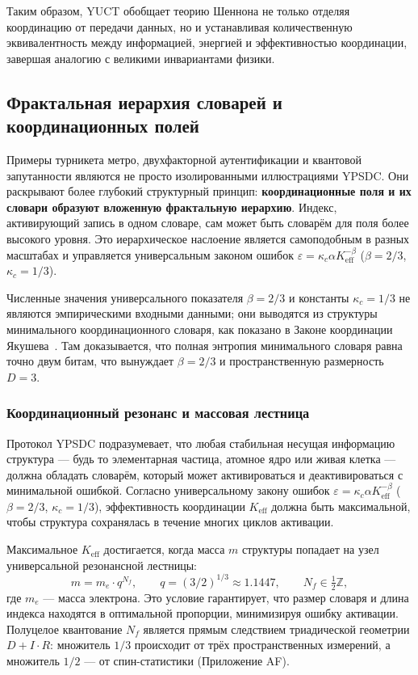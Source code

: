 \documentclass[12pt,a4paper]{article}
\theoremstyle{remark}
\begin{document}
	Таким образом, YUCT обобщает теорию Шеннона не только отделяя координацию от передачи данных, но и устанавливая количественную эквивалентность между информацией, энергией и эффективностью координации, завершая аналогию с великими инвариантами физики.
	
	\subsection{Фрактальная иерархия словарей и координационных полей}
	\label{subsec:fractal-hierarchy}
	
	Примеры турникета метро, двухфакторной аутентификации и квантовой запутанности являются не просто изолированными иллюстрациями YPSDC. Они раскрывают более глубокий структурный принцип: \textbf{координационные поля и их словари образуют вложенную фрактальную иерархию}. Индекс, активирующий запись в одном словаре, сам может быть словарём для поля более высокого уровня. Это иерархическое наслоение является самоподобным в разных масштабах и управляется универсальным законом ошибок $\varepsilon = \kappa_c \alpha K_{\mathrm{eff}}^{-\beta}$ ($\beta=2/3$, $\kappa_c=1/3$).
	
	Численные значения универсального показателя \(\beta = 2/3\) и константы \(\kappa_c = 1/3\) не являются эмпирическими входными данными; они выводятся из структуры минимального координационного словаря, как показано в Законе координации Якушева~\cite{YakushevLaw2026}. Там доказывается, что полная энтропия минимального словаря равна точно двум битам, что вынуждает \(\beta = 2/3\) и пространственную размерность \(D = 3\).
	
	\subsubsection{Координационный резонанс и массовая лестница}
	
	Протокол YPSDC подразумевает, что любая стабильная несущая информацию структура — будь то элементарная частица, атомное ядро или живая клетка — должна обладать словарём, который может активироваться и деактивироваться с минимальной ошибкой. Согласно универсальному закону ошибок \(\varepsilon = \kappa_c\alpha K_{\mathrm{eff}}^{-\beta}\) (\(\beta = 2/3\), \(\kappa_c = 1/3\)), эффективность координации \(K_{\mathrm{eff}}\) должна быть максимальной, чтобы структура сохранялась в течение многих циклов активации.
	
	Максимальное \(K_{\mathrm{eff}}\) достигается, когда масса \(m\) структуры попадает на узел универсальной резонансной лестницы:
	\[
	m = m_e \cdot q^{N_f}, \qquad
	q = (3/2)^{1/3} \approx 1.1447, \qquad N_f \in \tfrac{1}{2}\mathbb{Z},
	\]
	где \(m_e\) — масса электрона. Это условие гарантирует, что размер словаря и длина индекса находятся в оптимальной пропорции, минимизируя ошибку активации. Полуцелое квантование \(N_f\) является прямым следствием триадической геометрии \(D+I\!\cdot\!R\): множитель \(1/3\) происходит от трёх пространственных измерений, а множитель \(1/2\) — от спин-статистики (Приложение AF).
	
\end{document}
